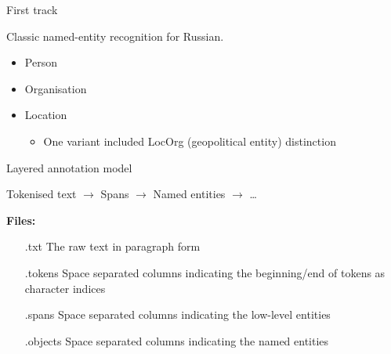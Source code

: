\documentclass[10pt, compress]{beamer}
\begin{document}
\begin{frame}{First track}

Classic named-entity recognition for Russian. 
\begin{itemize}
  \item Person
  \item Organisation
  \item Location
  \begin{itemize}
     \item One variant included LocOrg (geopolitical entity) distinction
  \end{itemize}
\end{itemize}

\end{frame}

\begin{frame}{Layered annotation model}

\begin{center}
Tokenised text $\rightarrow$ Spans $\rightarrow$ Named entities $\rightarrow$ \ldots
\end{center}

\textbf{Files:}
\begin{itemize}
  \item[.txt] The raw text in paragraph form
  \item[.tokens] Space separated columns indicating the beginning/end of tokens as character indices
  \item[.spans] Space separated columns indicating the low-level entities
  \item[.objects] Space separated columns indicating the named entities
\end{itemize}

\end{frame}
\end{document}
